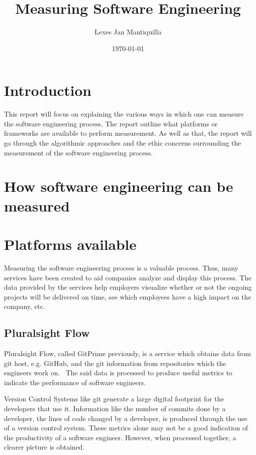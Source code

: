 \documentclass{article}
\title{Measuring Software Engineering}
\author{Lexes Jan Mantiquilla}
\date{\today}
\begin{document}
\maketitle
\newpage

\tableofcontents
\newpage

\section{Introduction}
This report will focus on explaining the various ways in which one can measure
the software engineering process. The report outline what platforms or
frameworks are available to perform measurement. As well as that, the report
will go through the algorithmic approaches and the ethic concerns surrounding
the measurement of the software engineering process.

\section{How software engineering can be measured}

\section{Platforms available}
Measuring the software engineering process is a valuable process. Thus, many
services have been created to aid companies analyze and display this process.
The data provided by the services help employers visualize whether or not the
ongoing projects will be delivered on time, see which employees have a high
impact on the company, etc.

\subsection{Pluralsight Flow}
Pluralsight Flow, called GitPrime previously, is a service which obtains data
from git host, e.g. GitHub, and the git information from repositories which the
engineers work on.~\cite{plural2019sight} The said data is processed to produce
useful metrics to indicate the performance of software engineers.

Version Control Systems like git generate a large digital footprint for the
developers that use it. Information like the number of commits done by a
developer, the lines of code changed by a developer, is produced through the
use of a version control system. These metrics alone may not be a good
indication of the productivity of a software engineer. However, when processed
together, a clearer picture is obtained.
\end{document}
